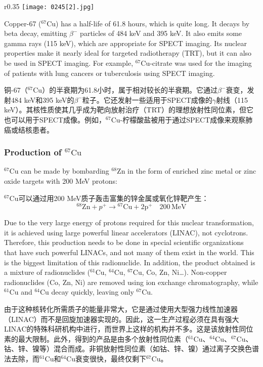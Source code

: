 \documentclass[dvipsnames, svgnames,a4paper,11pt]{article}
\begin{document}
\begin{wrapfigure}{r}{0.35\textwidth}
    \centering
    \texttt{[image: 0245[2].jpg]}
     \label{fig328}
\end{wrapfigure}

Copper-67 (\(\mathrm{^{67}Cu}\)) has a half-life of 61.8 hours, which is quite long. It decays by beta decay, emitting \(\beta^-\) particles of 484 keV and 395 keV. It also emits some gamma rays (115 keV), which are appropriate for SPECT imaging. Its nuclear properties make it nearly ideal for targeted radiotherapy (TRT), but it can also be used in SPECT imaging. For example, \(\mathrm{^{67}Cu}\)-citrate was used for the imaging of patients with lung cancers or tuberculosis using SPECT imaging.

铜-67（\(\mathrm{^{67}Cu}\)）的半衰期为61.8小时，属于相对较长的半衰期。它通过\(\beta^-\)衰变，发射484 keV和395 keV的\(\beta^-\)粒子。它还发射一些适用于SPECT成像的$\gamma$射线（115 keV）。其核性质使其几乎成为靶向放射治疗（TRT）的理想放射性同位素，但它也可以用于SPECT成像。例如，\(\mathrm{^{67}Cu}\)-柠檬酸盐被用于通过SPECT成像来观察肺癌或结核患者。

\subsubsection{Production of \(\mathrm{^{67}Cu}\)}  
\(\mathrm{^{67}Cu}\) can be made by bombarding \(\mathrm{^{68}Zn}\) in the form of enriched zinc metal or zinc oxide targets with 200 MeV protons:

\(\mathrm{^{67}Cu}\)可以通过用200 MeV质子轰击富集的锌金属或氧化锌靶产生：
\[
\mathrm{^{68}Zn} + p^+ \rightarrow \mathrm{^{67}Cu+ 2p^+ \quad 200 \, MeV} 
\]

Due to the very large energy of protons required for this nuclear transformation, it is achieved using large powerful linear accelerators (LINAC), not cyclotrons. Therefore, this production needs to be done in special scientific organizations that have such powerful LINACs, and not many of them exist in the world. This is the biggest limitation of this radionuclide. In addition, the product obtained is a mixture of radionuclides (\(\mathrm{^{61}Cu}\), \(\mathrm{^{64}Cu}\), \(\mathrm{^{67}Cu}\), Co, Zn, Ni…). Non-copper radionuclides (Co, Zn, Ni) are removed using ion exchange chromatography, while \(\mathrm{^{61}Cu}\) and \(\mathrm{^{64}Cu}\) decay quickly, leaving only \(\mathrm{^{67}Cu}\).

由于这种核转化所需质子的能量非常大，它是通过使用大型强力线性加速器（LINAC）而不是回旋加速器实现的。因此，这一生产过程必须在具有强大LINAC的特殊科研机构中进行，而世界上这样的机构并不多。这是该放射性同位素的最大限制。此外，得到的产品是由多个放射性同位素（\(\mathrm{^{61}Cu}\)、\(\mathrm{^{64}Cu}\)、\(\mathrm{^{67}Cu}\)、钴、锌、镍等）混合而成。非铜放射性同位素（如钴、锌、镍）通过离子交换色谱法去除，而\(\mathrm{^{61}Cu}\)和\(\mathrm{^{64}Cu}\)衰变很快，最终仅剩下\(\mathrm{^{67}Cu}\)。
\end{document}
